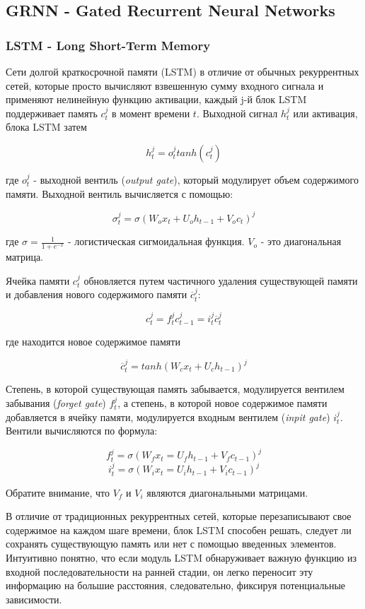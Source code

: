 \documentclass[a4paper,12pt]{article}
\begin{document}
	\clearpage
	
	\subsection{GRNN - Gated Recurrent Neural Networks}
	\subsubsection{LSTM - Long Short-Term Memory}
	
	Сети долгой краткосрочной памяти (LSTM) в отличие от обычных рекуррентных сетей, которые просто вычисляют взвешенную сумму входного сигнала и применяют нелинейную функцию активации, каждый j-й блок LSTM поддерживает память $c^{j}_{t}$ в момент времени $t$. Выходной сигнал $h^{j}_{t}$ или активация, блока LSTM затем
	
	$$h^{j}_{t} = o^{j}_{t} tanh(c^{j}_{t})$$
	
	где $o^{j}_{t}$  - выходной вентиль (\textit{output gate}), который модулирует объем содержимого памяти. Выходной вентиль вычисляется с помощью:
	
	$$ \sigma^{j}_{t} = \sigma(W_{o} x_{t} + U_{o} h_{t - 1} + V_{o} c_{t})^{j}$$
	
	где $\sigma = \frac{1}{1 + e^{-x}}$ - логистическая сигмоидальная функция. $V_{o}$ - это диагональная матрица.
	
	Ячейка памяти $c^{j}_{t}$ обновляется путем частичного удаления существующей памяти и добавления нового содержимого памяти $\overline{c}_{t}^{j}$:
	
	$$ c^{j}_{t} = f^{j}_{t} c^{j}_{t - 1} = i^{j}_{t} \overline{c}_{t}^{j}$$
	
	где находится новое содержимое памяти
	
	$$ \overline{c}_{t}^{j} = tanh(W_{c} x_{t} + U_{c} h_{t - 1})^j $$
	
	Степень, в которой существующая память забывается, модулируется вентилем забывания (\textit{forget gate}) $f^{j}_{t}$, а степень, в которой новое содержимое памяти добавляется в ячейку памяти, модулируется входным вентилем (\textit{inpit gate}) $i^{j}_{t}$. Вентили вычисляются по формула:
	
	$$ f^{j}_{t} = \sigma(W_f x_t = U_f h_{t - 1} + V_f c_{t - 1})^j $$
	$$ i^{j}_{t} = \sigma(W_i x_t = U_i h_{t - 1} + V_i c_{t - 1})^j $$
	
	Обратите внимание, что $V_f$ и $V_i$ являются диагональными матрицами.
	
	В отличие от традиционных рекуррентных сетей, которые перезаписывают свое содержимое на каждом шаге времени, блок LSTM способен решать, следует ли сохранять существующую память или нет с помощью введенных элементов. Интуитивно понятно, что если модуль LSTM обнаруживает важную функцию из входной последовательности на ранней стадии, он легко переносит эту информацию на большие расстояния, следовательно, фиксируя потенциальные зависимости.
	
\end{document}
